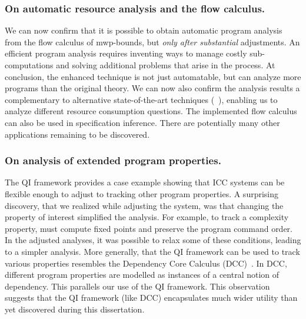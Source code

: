 \subsubsection*{On automatic resource analysis and the flow calculus.}
We can now confirm that it is possible to obtain automatic program analysis from the flow calculus of mwp-bounds, but \emph{only after substantial} adjustments.
An efficient program analysis requires inventing ways to manage costly sub-computations and solving additional problems that arise in the process.
At conclusion, the enhanced technique is not just automatable, but can analyze more programs than the original theory.
We can now also confirm the analysis results a complementary to alternative state-of-the-art techniques (\cf~\cite[p. 5]{aubert2023b}), enabling us to analyze different resource consumption questions.
The implemented flow calculus can also be used in specification inference.
There are potentially many other applications remaining to be discovered.

\subsubsection*{On analysis of extended program properties.}
The QI framework provides a case example showing that ICC systems can be flexible enough to adjust to tracking other program properties.
A surprising discovery, that we realized while adjusting the system, was that changing the property of interest simplified the analysis.
For example, to track a complexity property, must compute fixed points and preserve the program command order.
In the adjusted analyses, it was possible to relax some of these conditions, leading to a simpler analysis.
More generally, that the QI framework can be used to track various properties resembles the Dependency Core Calculus (DCC)~\cite{abadi1999b}.
In DCC, different program properties are modelled as instances of a central notion of dependency.
This parallels our use of the QI framework.
This observation suggests that the QI framework (like DCC) encapsulates much wider utility than yet discovered during this dissertation.

